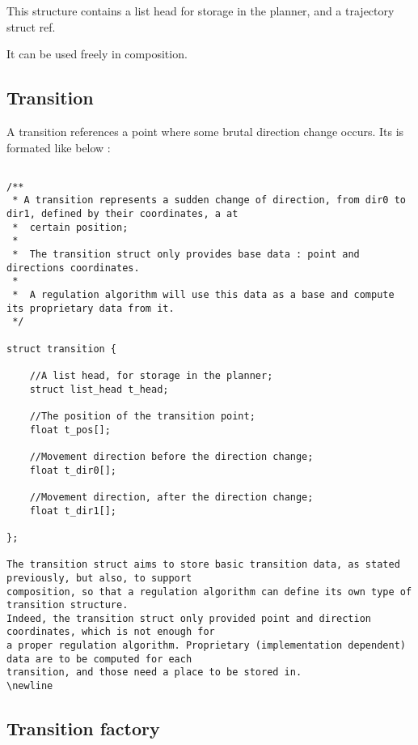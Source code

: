 This structure contains a list head for storage in the planner, and a trajectory struct ref.
\newline

It can be used freely in composition.
\newline


\subsection{Transition}

A transition references a point where some brutal direction change occurs. Its is formated like below : 

\begin{lstlisting}[style=CStyle]

/**
 * A transition represents a sudden change of direction, from dir0 to dir1, defined by their coordinates, a at
 *  certain position;
 *
 *  The transition struct only provides base data : point and directions coordinates.
 *
 *  A regulation algorithm will use this data as a base and compute its proprietary data from it.
 */

struct transition {
	
	//A list head, for storage in the planner;	
	struct list_head t_head;

    //The position of the transition point;   
    float t_pos[];

    //Movement direction before the direction change;
    float t_dir0[];

    //Movement direction, after the direction change;
    float t_dir1[];

};

The transition struct aims to store basic transition data, as stated previously, but also, to support 
composition, so that a regulation algorithm can define its own type of transition structure. 
Indeed, the transition struct only provided point and direction coordinates, which is not enough for 
a proper regulation algorithm. Proprietary (implementation dependent) data are to be computed for each 
transition, and those need a place to be stored in.
\newline

\end{lstlisting}

\newpage

\subsection{Transition factory}

